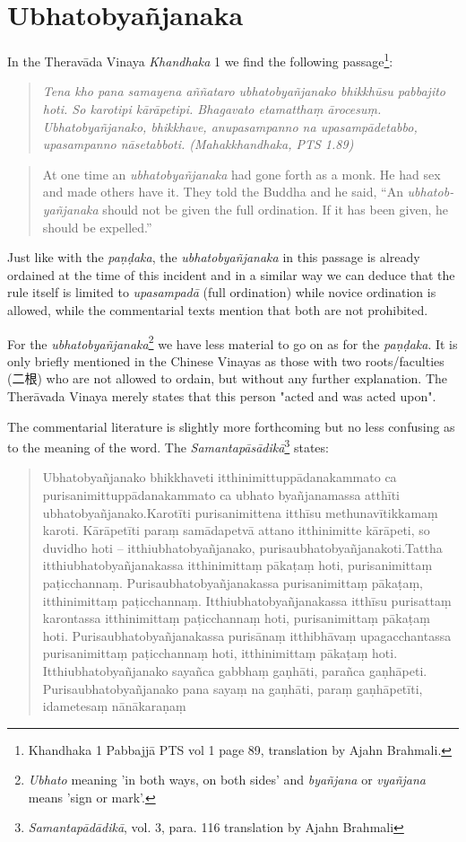 \section{Ubhatob­yañ­janaka}
In the Theravāda Vinaya {\em Khandhaka} 1 we find the following passage\footnote{Khandhaka 1 Pabbajjā PTS vol 1 page 89, translation by Ajahn Brahmali.}:

\begin{quote}
{\em Tena kho pana samayena aññataro ubhatobyañjanako bhikkhūsu pabbajito hoti. So karotipi kārāpetipi. Bhagavato etamatthaṃ ārocesuṃ. Ubhatobyañjanako, bhikkhave, anupasampanno na upasampādetabbo, upasampanno nāsetabboti. (Mahakkhandhaka, PTS 1.89)}
\end{quote}

\begin{quote}
At one time an {\em ubhatob­yañ­janaka} had gone forth as a monk. He had sex and made others have it. They told the Buddha and he said, “An {\em ubhatob­yañ­janaka} should not be given the full ordination. If it has been given, he should be expelled.”
\end{quote}

Just like with the {\em paṇḍaka}, the {\em ubhatob­yañ­janaka} in this passage is already ordained at the time of this incident and in a similar way we can deduce that the rule itself is limited to {\em upasampadā} (full ordination) while novice ordination is allowed, while the commentarial texts mention that both are not prohibited.

For the {\em ubhatob­yañ­janaka}\footnote{{\em Ubhato} meaning 'in both ways, on both sides' and {\em byañjana} or {\em vyañjana} means 'sign or mark'.} we have less material to go on as for the {\em paṇḍaka}. It is only briefly mentioned in the Chinese Vinayas as those with two roots/faculties (二根) who are not allowed to ordain, but without any further explanation. The Therāvada Vinaya merely states that this person "acted and was acted upon". 

The commentarial literature is slightly more forthcoming but no less confusing as to the meaning of the word. The {\em Samantapāsādikā}\footnote{{\em Samantapādādikā}, vol. 3, para. 116 translation by Ajahn Brahmali} states:

\begin{quote}
Ubhatobyañjanako bhikkhaveti itthinimittuppādanakammato ca purisanimittuppādanakammato ca ubhato byañjanamassa atthīti ubhatobyañjanako.Karotīti purisanimittena itthīsu methunavītikkamaṃ karoti. Kārāpetīti paraṃ samādapetvā attano itthinimitte kārāpeti, so duvidho hoti – itthiubhatobyañjanako, purisaubhatobyañjanakoti.Tattha itthiubhatobyañjanakassa itthinimittaṃ pākaṭaṃ hoti, purisanimittaṃ paṭicchannaṃ. Purisaubhatobyañjanakassa purisanimittaṃ pākaṭaṃ, itthinimittaṃ paṭicchannaṃ. Itthiubhatobyañjanakassa itthīsu purisattaṃ karontassa itthinimittaṃ paṭicchannaṃ hoti, purisanimittaṃ pākaṭaṃ hoti. Purisaubhatobyañjanakassa purisānaṃ itthibhāvaṃ upagacchantassa purisanimittaṃ paṭicchannaṃ hoti, itthinimittaṃ pākaṭaṃ hoti. Itthiubhatobyañjanako sayañca gabbhaṃ gaṇhāti, parañca gaṇhāpeti. Purisaubhatobyañjanako pana sayaṃ na gaṇhāti, paraṃ gaṇhāpetīti, idametesaṃ nānākaraṇaṃ
\end{quote}

